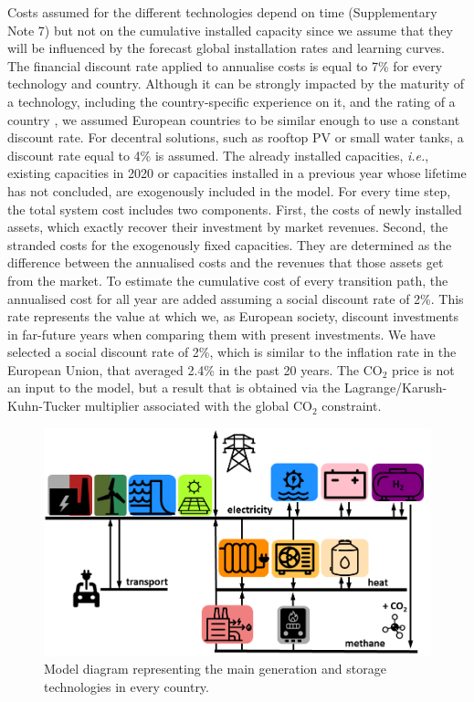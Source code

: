 \documentclass[5p]{elsarticle} %
\begin{document}

Costs assumed for the different technologies depend on time (Supplementary Note 7) but not on the cumulative installed capacity since we assume that they will be influenced by the forecast global installation rates and learning curves. The financial discount rate applied to annualise costs is equal to 7\% for every technology and country. Although it can be strongly impacted by the maturity of a technology, including the country-specific experience on it, and the rating of a country \cite{Egli_2019}, we assumed European countries to be similar enough to use a constant discount rate. For decentral solutions, such as rooftop PV or small water tanks, a discount rate equal to 4\% is assumed. The already installed capacities, \textit{i.e.}, existing capacities in 2020 or capacities installed in a previous year whose lifetime has not concluded, are exogenously included in the model. For every time step, the total system cost includes two components. First, the costs of newly installed assets, which exactly recover their investment by market revenues. Second, the stranded costs for the exogenously fixed capacities. They are determined as the difference between the annualised costs and the revenues that those assets get from the market.  To estimate the cumulative cost of every transition path, the annualised cost for all year are added assuming a social discount rate of 2\%. This rate represents the value at which we, as European society, discount investments in far-future years when comparing them with present investments. We have selected a social discount rate of 2\%, which is similar to the inflation rate in the European Union, that averaged 2.4\% in the past 20 years. The CO$_2$ price is not an input to the model, but a result that is obtained via the Lagrange/Karush-Kuhn-Tucker multiplier associated with the global CO$_2$ constraint. 
\begin{figure}[!h]
\centering
\includegraphics[width=\columnwidth]{figures/model.png}
\caption{Model diagram representing the main generation and storage technologies in every country.} \label{fig_model} 
\end{figure}
\end{document}
